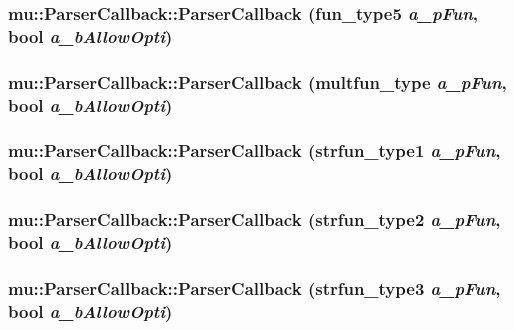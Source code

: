 \subsubsection[ParserCallback]{\setlength{\rightskip}{0pt plus 5cm}mu::ParserCallback::ParserCallback ({\bf fun\_\-type5} {\em a\_\-pFun}, \/  bool {\em a\_\-bAllowOpti})}\label{classmu_1_1ParserCallback_eba7f6318f9efcadd2adc9a0aa9a6b90}


\subsubsection[ParserCallback]{\setlength{\rightskip}{0pt plus 5cm}mu::ParserCallback::ParserCallback ({\bf multfun\_\-type} {\em a\_\-pFun}, \/  bool {\em a\_\-bAllowOpti})}\label{classmu_1_1ParserCallback_fd7a7863138953853ad08c49cb781ca9}


\subsubsection[ParserCallback]{\setlength{\rightskip}{0pt plus 5cm}mu::ParserCallback::ParserCallback ({\bf strfun\_\-type1} {\em a\_\-pFun}, \/  bool {\em a\_\-bAllowOpti})}\label{classmu_1_1ParserCallback_027d02e29d93c0cfccc0a3780b59b9fb}


\subsubsection[ParserCallback]{\setlength{\rightskip}{0pt plus 5cm}mu::ParserCallback::ParserCallback ({\bf strfun\_\-type2} {\em a\_\-pFun}, \/  bool {\em a\_\-bAllowOpti})}\label{classmu_1_1ParserCallback_e875518b280a457291178a204e538bcf}


\subsubsection[ParserCallback]{\setlength{\rightskip}{0pt plus 5cm}mu::ParserCallback::ParserCallback ({\bf strfun\_\-type3} {\em a\_\-pFun}, \/  bool {\em a\_\-bAllowOpti})}\label{classmu_1_1ParserCallback_5fcbcd39382aaa95b4bfd39c83f03be6}



